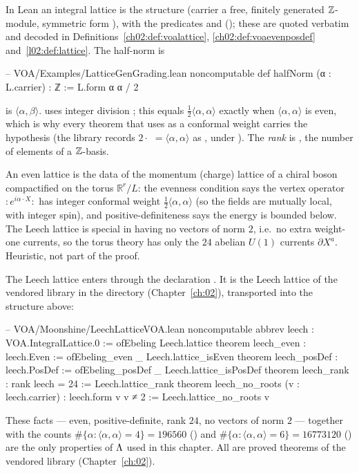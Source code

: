 In Lean an integral lattice is the structure  (carrier a free, finitely
generated ${\mathbb{Z}}$-module, symmetric form ), with the predicates  and
 (); these are quoted verbatim and decoded in
Definitions~\ref{ch02:def:voalattice}, \ref{ch02:def:voaevenposdef} and~\ref{l02:def:lattice}.
The half-norm is
\begin{leancode}
-- VOA/Examples/LatticeGenGrading.lean
noncomputable def halfNorm (α : L.carrier) : ℤ := L.form α α / 2
\end{leancode}

\begin{dictionary}
 is $\langle\alpha,\beta\rangle$.  uses integer division
; this equals $\tfrac12\langle\alpha,\alpha\rangle$ exactly when $\langle\alpha,\alpha\rangle$
is even, which is why every theorem that uses  as a conformal weight carries the
hypothesis  (the library records $2\cdot$
$=\langle\alpha,\alpha\rangle$ as , under ). The \emph{rank}
 is , the number of elements of a ${\mathbb{Z}}$-basis.
\end{dictionary}

\begin{physics}
An even lattice is the data of the momentum (charge) lattice of a chiral boson compactified on the torus $\mathbb R^r/L$: the evenness condition says the vertex operator $:\!e^{i\alpha\cdot X}\!:$ has integer conformal weight $\tfrac12\langle\alpha,\alpha\rangle$ (so the fields are mutually local, with integer spin), and positive-definiteness says the energy is bounded below. The Leech lattice is special in having no vectors of norm $2$, i.e.\ no extra weight-one currents, so the torus theory has only the $24$ abelian $U(1)$ currents $\partial X^a$. Heuristic, not part of the proof.
\end{physics}

The Leech lattice enters through the declaration . It is the Leech
lattice of the vendored library in the directory 
(Chapter~\ref{ch:02}), transported into the structure above:
\begin{leancode}
-- VOA/Moonshine/LeechLatticeVOA.lean
noncomputable abbrev leech : VOA.IntegralLattice.{0} := ofEbeling Leech.lattice
theorem leech_even : leech.Even := ofEbeling_even _ Leech.lattice_isEven
theorem leech_posDef : leech.PosDef := ofEbeling_posDef _ Leech.lattice_isPosDef
theorem leech_rank : rank leech = 24 := Leech.lattice_rank
theorem leech_no_roots (v : leech.carrier) : leech.form v v ≠ 2 := Leech.lattice_no_roots v
\end{leancode}
These facts --- even, positive-definite, rank $24$, no vectors of norm $2$ --- together with the
counts $\#\{\alpha:\langle\alpha,\alpha\rangle=4\}=196560$ () and
$\#\{\alpha:\langle\alpha,\alpha\rangle=6\}=16773120$ () are the only
properties of ${\Lambda}$ used in this chapter. All are proved theorems of the vendored library
(Chapter~\ref{ch:02}).

